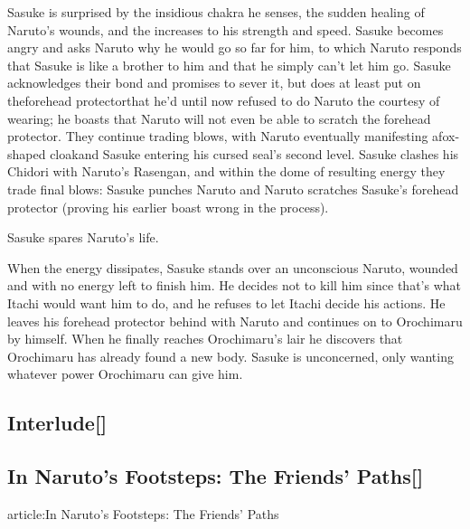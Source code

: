 \documentclass[a4paper,12pt]{article}
\begin{document}
Sasuke is surprised by the insidious chakra he senses, the sudden healing of Naruto's wounds, and the increases to his strength and speed. Sasuke becomes angry and asks Naruto why he would go so far for him, to which Naruto responds that Sasuke is like a brother to him and that he simply can't let him go. Sasuke acknowledges their bond and promises to sever it, but does at least put on theforehead protectorthat he'd until now refused to do Naruto the courtesy of wearing; he boasts that Naruto will not even be able to scratch the forehead protector. They continue trading blows, with Naruto eventually manifesting afox-shaped cloakand Sasuke entering his cursed seal's second level. Sasuke clashes his Chidori with Naruto's Rasengan, and within the dome of resulting energy they trade final blows: Sasuke punches Naruto and Naruto scratches Sasuke's forehead protector (proving his earlier boast wrong in the process).\\ \par \vspace{0.5cm}

Sasuke spares Naruto's life.\\ \par \vspace{0.5cm}

When the energy dissipates, Sasuke stands over an unconscious Naruto, wounded and with no energy left to finish him. He decides not to kill him since that's what Itachi would want him to do, and he refuses to let Itachi decide his actions. He leaves his forehead protector behind with Naruto and continues on to Orochimaru by himself. When he finally reaches Orochimaru's lair he discovers that Orochimaru has already found a new body. Sasuke is unconcerned, only wanting whatever power Orochimaru can give him.\\ \par \vspace{0.5cm}

\subsection*{Interlude[]}\n\n\subsection*{In Naruto's Footsteps: The Friends' Paths[]}\n\nMain article:In Naruto's Footsteps: The Friends' Paths\\ \par \vspace{0.5cm}
\end{document}
